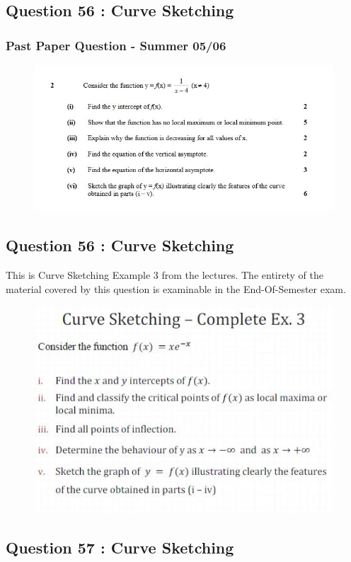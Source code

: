 \documentclass[]{article}
\begin{document}
\subsection*{Question 56 : Curve Sketching}
\subsubsection*{ Past Paper Question - Summer 05/06}
\begin{figure}[h!]
	\centering
	\includegraphics[width=0.87\linewidth]{curvesketching0506}
	
\end{figure}
\newpage
\subsection*{Question 56 : Curve Sketching}

This is Curve Sketching Example 3 from the lectures. The entirety of the material covered by this question is examinable in the End-Of-Semester exam.

\begin{figure}[h!]
	\centering
	\includegraphics[width=0.6\linewidth]{Q17curvesketching}
	
\end{figure}
\subsection*{Question 57 : Curve Sketching}
\end{document}
